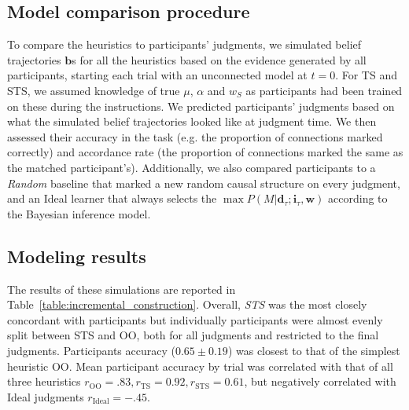 \documentclass[10pt,letterpaper]{article}
\newcommand{\ntodo}[2][]
{\todo[caption={#2}, size=\small, #1, color = yellow, inline]{\renewcommand{\baselinestretch}{1}\selectfont \textbf{NB}: #2}~}
\newcommand{\srtodo}[2][]
{\todo[size=\footnotesize, color = green, #1]{#2}~}
\newcommand{\ww}{\mathbf{w}} %
\newcommand{\ws}{w_S} %
\newcommand{\ci}{\mathbf{i}} %
\newcommand{\da}{\mathbf{d}} %
\begin{document}
\subsection{Model comparison procedure}

To compare the heuristics to participants' judgments, we simulated belief trajectories $\textbf{b}$s for all the heuristics based on the evidence generated by all participants, starting each trial with an unconnected model at $t=0$.  For TS and STS, we assumed knowledge of true $\mu$, $\alpha$ and $\ws$ as participants had been trained on these during the instructions. We predicted participants' judgments based on what the simulated belief trajectories looked like at judgment time. 
We then assessed their accuracy in the task (e.g. the proportion of connections marked correctly) and accordance rate (the proportion of connections marked the same as the matched participant's).  Additionally, we also compared participants to a \emph{Random} baseline that marked a new random causal structure on every judgment, and an Ideal learner that always selects the $\max P(M|\da_\tau;\ci_\tau, \ww)$ according to the Bayesian inference model.     

\subsection{Modeling results}

The results of these simulations are reported in Table~\ref{table:incremental_construction}.  Overall, \emph{STS} was the most closely concordant with participants but individually participants were almost evenly split between STS and OO, both for all judgments and restricted to the final judgments. %
Participants accuracy ($0.65\pm0.19$) was closest to that of the simplest heuristic OO.  Mean participant accuracy by trial was correlated with that of all three heuristics $r_{\mathrm{OO}}=.83, r_{\mathrm{TS}}=0.92, r_{\mathrm{STS}}=0.61$, but negatively correlated with Ideal judgments $r_{\mathrm{Ideal}}=-.45$.
\end{document}

